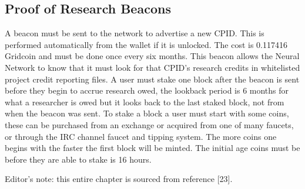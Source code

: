 \subsection{Proof of Research Beacons}

A beacon must be sent to the network to advertise a new CPID. This is performed automatically from the wallet if it is unlocked. The cost is 0.117416 Gridcoin and must be done once every six months. This beacon allows the Neural Network to know that it must look for that CPID's research credits in whitelisted project credit reporting files. A user must stake one block after the beacon is sent before they begin to accrue research owed, the lookback period is 6 months for what a researcher is owed but it looks back to the last staked block, not from when the beacon was sent. To stake a block a user must start with some coins, these can be purchased from an exchange or acquired from one of many faucets, or through the IRC channel faucet and tipping system. The more coins one begins with the faster the first block will be minted.  The initial age coins must be before they are able to stake is 16 hours.

Editor's note: this entire chapter is sourced from reference [23].\\
